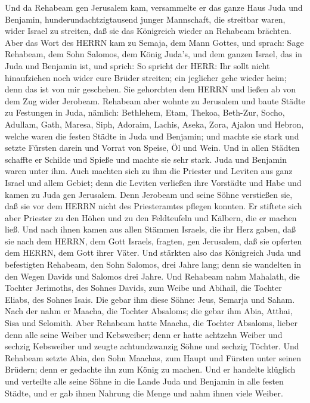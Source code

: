  Und da Rehabeam gen Jerusalem kam, versammelte er das ganze
Haus Juda und Benjamin, hunderundachtzigtausend junger Mannschaft, die
streitbar waren, wider Israel zu streiten, daß sie das Königreich wieder
an Rehabeam brächten.  Aber das Wort des HERRN kam zu
Semaja, dem Mann Gottes, und sprach:  Sage Rehabeam, dem
Sohn Salomos, dem König Juda's, und dem ganzen Israel, das in Juda und
Benjamin ist, und sprich:  So spricht der HERR: Ihr sollt
nicht hinaufziehen noch wider eure Brüder streiten; ein jeglicher gehe
wieder heim; denn das ist von mir geschehen. Sie gehorchten dem HERRN
und ließen ab von dem Zug wider Jerobeam.  Rehabeam aber
wohnte zu Jerusalem und baute Städte zu Festungen in Juda, 
nämlich: Bethlehem, Etam, Thekoa,  Beth-Zur, Socho, Adullam,
 Gath, Maresa, Siph,  Adoraim, Lachis, Aseka,
 Zora, Ajalon und Hebron, welche waren die festen Städte in
Juda und Benjamin;  und machte sie stark und setzte Fürsten
darein und Vorrat von Speise, Öl und Wein.  Und in allen
Städten schaffte er Schilde und Spieße und machte sie sehr stark. Juda
und Benjamin waren unter ihm.  Auch machten sich zu ihm die
Priester und Leviten aus ganz Israel und allem Gebiet; 
denn die Leviten verließen ihre Vorstädte und Habe und kamen zu Juda gen
Jerusalem. Denn Jerobeam und seine Söhne verstießen sie, daß sie vor dem
HERRN nicht des Priesteramtes pflegen konnten.  Er stiftete
sich aber Priester zu den Höhen und zu den Feldteufeln und Kälbern, die
er machen ließ.  Und nach ihnen kamen aus allen Stämmen
Israels, die ihr Herz gaben, daß sie nach dem HERRN, dem Gott Israels,
fragten, gen Jerusalem, daß sie opferten dem HERRN, dem Gott ihrer
Väter.  Und stärkten also das Königreich Juda und
befestigten Rehabeam, den Sohn Salomos, drei Jahre lang; denn sie
wandelten in den Wegen Davids und Salomos drei Jahre.  Und
Rehabeam nahm Mahalath, die Tochter Jerimoths, des Sohnes Davids, zum
Weibe und Abihail, die Tochter Eliabs, des Sohnes Isais. 
Die gebar ihm diese Söhne: Jeus, Semarja und Saham.  Nach
der nahm er Maacha, die Tochter Absaloms; die gebar ihm Abia, Atthai,
Sisa und Selomith.  Aber Rehabeam hatte Maacha, die Tochter
Absaloms, lieber denn alle seine Weiber und Kebsweiber; denn er hatte
achtzehn Weiber und sechzig Kebsweiber und zeugte achtundzwanzig Söhne
und sechzig Töchter.  Und Rehabeam setzte Abia, den Sohn
Maachas, zum Haupt und Fürsten unter seinen Brüdern; denn er gedachte
ihn zum König zu machen.  Und er handelte klüglich und
verteilte alle seine Söhne in die Lande Juda und Benjamin in alle festen
Städte, und er gab ihnen Nahrung die Menge und nahm ihnen viele Weiber.

